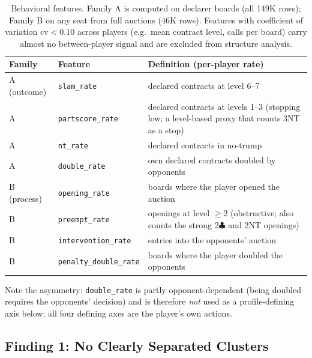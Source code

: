 \documentclass[11pt,a4paper]{article}
\begin{document}
\begin{table}[h]
\centering\small
\caption{Behavioral features. Family A is computed on declarer boards
(all 149K rows); Family B on any seat from full auctions (46K rows).
Features with coefficient of variation $\mathrm{cv}<0.10$ across players
(e.g.\ mean contract level, calls per board) carry almost no
between-player signal and are excluded from structure analysis.}
\label{tab:features}
\begin{tabular}{llp{6.6cm}}
\toprule
Family & Feature & Definition (per-player rate)\\
\midrule
A (outcome) & \texttt{slam\_rate}      & declared contracts at level 6--7\\
A & \texttt{partscore\_rate} & declared contracts at levels 1--3 (stopping low; a level-based proxy that counts 3NT as a stop)\\
A & \texttt{nt\_rate}        & declared contracts in no-trump\\
A & \texttt{double\_rate}    & own declared contracts doubled by opponents\\
\midrule
B (process) & \texttt{opening\_rate}      & boards where the player opened the auction\\
B & \texttt{preempt\_rate}       & openings at level $\ge 2$ (obstructive; also counts the strong 2$\clubsuit$ and 2NT openings)\\
B & \texttt{intervention\_rate}  & entries into the opponents' auction\\
B & \texttt{penalty\_double\_rate} & boards where the player doubled the
opponents\footnotemark\\
\bottomrule
\end{tabular}
\end{table}

Note the asymmetry: \texttt{double\_rate} is partly
opponent-dependent (being doubled requires the opponents' decision) and
is therefore \emph{not} used as a profile-defining axis below; all four
defining axes are the player's own actions.

\subsection{Finding 1: No Clearly Separated Clusters}\label{sec:continuum}
\end{document}
